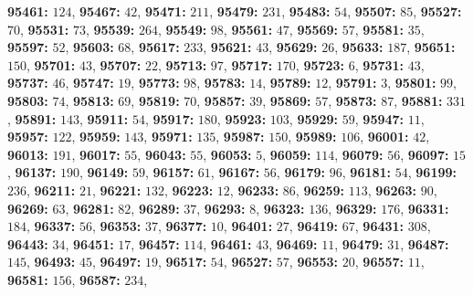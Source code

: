 \textsf{\bfseries 95461:} $124$, \textsf{\bfseries 95467:} $42$, \textsf{\bfseries 95471:} $211$, \textsf{\bfseries 95479:} $231$, \textsf{\bfseries 95483:} $54$, \textsf{\bfseries 95507:} $85$, \textsf{\bfseries 95527:} $70$, \textsf{\bfseries 95531:} $73$, \textsf{\bfseries 95539:} $264$, \textsf{\bfseries 95549:} $98$, \textsf{\bfseries 95561:} $47$, \textsf{\bfseries 95569:} $57$, \textsf{\bfseries 95581:} $35$, \textsf{\bfseries 95597:} $52$, \textsf{\bfseries 95603:} $68$, \textsf{\bfseries 95617:} $233$, \textsf{\bfseries 95621:} $43$, \textsf{\bfseries 95629:} $26$, \textsf{\bfseries 95633:} $187$, \textsf{\bfseries 95651:} $150$, \textsf{\bfseries 95701:} $43$, \textsf{\bfseries 95707:} $22$, \textsf{\bfseries 95713:} $97$, \textsf{\bfseries 95717:} $170$, \textsf{\bfseries 95723:} $6$, \textsf{\bfseries 95731:} $43$, \textsf{\bfseries 95737:} $46$, \textsf{\bfseries 95747:} $19$, \textsf{\bfseries 95773:} $98$, \textsf{\bfseries 95783:} $14$, \textsf{\bfseries 95789:} $12$, \textsf{\bfseries 95791:} $3$, \textsf{\bfseries 95801:} $99$, \textsf{\bfseries 95803:} $74$, \textsf{\bfseries 95813:} $69$, \textsf{\bfseries 95819:} $70$, \textsf{\bfseries 95857:} $39$, \textsf{\bfseries 95869:} $57$, \textsf{\bfseries 95873:} $87$, \textsf{\bfseries 95881:} $331$, \textsf{\bfseries 95891:} $143$, \textsf{\bfseries 95911:} $54$, \textsf{\bfseries 95917:} $180$, \textsf{\bfseries 95923:} $103$, \textsf{\bfseries 95929:} $59$, \textsf{\bfseries 95947:} $11$, \textsf{\bfseries 95957:} $122$, \textsf{\bfseries 95959:} $143$, \textsf{\bfseries 95971:} $135$, \textsf{\bfseries 95987:} $150$, \textsf{\bfseries 95989:} $106$, \textsf{\bfseries 96001:} $42$, \textsf{\bfseries 96013:} $191$, \textsf{\bfseries 96017:} $55$, \textsf{\bfseries 96043:} $55$, \textsf{\bfseries 96053:} $5$, \textsf{\bfseries 96059:} $114$, \textsf{\bfseries 96079:} $56$, \textsf{\bfseries 96097:} $15$, \textsf{\bfseries 96137:} $190$, \textsf{\bfseries 96149:} $59$, \textsf{\bfseries 96157:} $61$, \textsf{\bfseries 96167:} $56$, \textsf{\bfseries 96179:} $96$, \textsf{\bfseries 96181:} $54$, \textsf{\bfseries 96199:} $236$, \textsf{\bfseries 96211:} $21$, \textsf{\bfseries 96221:} $132$, \textsf{\bfseries 96223:} $12$, \textsf{\bfseries 96233:} $86$, \textsf{\bfseries 96259:} $113$, \textsf{\bfseries 96263:} $90$, \textsf{\bfseries 96269:} $63$, \textsf{\bfseries 96281:} $82$, \textsf{\bfseries 96289:} $37$, \textsf{\bfseries 96293:} $8$, \textsf{\bfseries 96323:} $136$, \textsf{\bfseries 96329:} $176$, \textsf{\bfseries 96331:} $184$, \textsf{\bfseries 96337:} $56$, \textsf{\bfseries 96353:} $37$, \textsf{\bfseries 96377:} $10$, \textsf{\bfseries 96401:} $27$, \textsf{\bfseries 96419:} $67$, \textsf{\bfseries 96431:} $308$, \textsf{\bfseries 96443:} $34$, \textsf{\bfseries 96451:} $17$, \textsf{\bfseries 96457:} $114$, \textsf{\bfseries 96461:} $43$, \textsf{\bfseries 96469:} $11$, \textsf{\bfseries 96479:} $31$, \textsf{\bfseries 96487:} $145$, \textsf{\bfseries 96493:} $45$, \textsf{\bfseries 96497:} $19$, \textsf{\bfseries 96517:} $54$, \textsf{\bfseries 96527:} $57$, \textsf{\bfseries 96553:} $20$, \textsf{\bfseries 96557:} $11$, \textsf{\bfseries 96581:} $156$, \textsf{\bfseries 96587:} $234$, 
